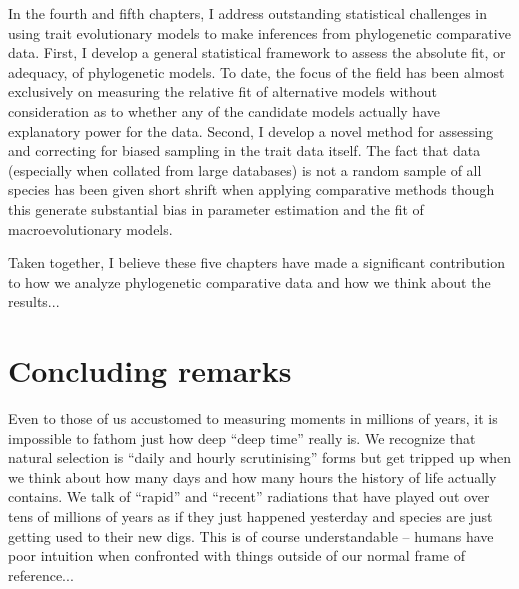 In the fourth and fifth chapters, I address outstanding statistical challenges in using trait evolutionary models to make inferences from phylogenetic comparative data. First, I develop a general statistical framework to assess the absolute fit, or adequacy, of phylogenetic models. To date, the focus of the field has been almost exclusively on measuring the relative fit of alternative models without consideration as to whether any of the candidate models actually have explanatory power for the data. Second, I develop a novel method for assessing and correcting for biased sampling in the trait data itself. The fact that data (especially when collated from large databases) is not a random sample of all species has been given short shrift when applying comparative methods though this generate substantial bias in parameter estimation and the fit of macroevolutionary models. 

Taken together, I believe these five chapters have made a significant contribution to how we analyze phylogenetic comparative data and how we think about the results...

\section{Concluding remarks}
Even to those of us accustomed to measuring moments in millions of years, it is impossible to fathom just how deep ``deep time'' really is. We recognize that natural selection is ``daily and hourly scrutinising'' \citep[][p. 84]{Darwin1859} forms but get tripped up when we think about how many days and how many hours the history of life actually contains. We talk of ``rapid'' and ``recent'' radiations that have played out over tens of millions of years as if they just happened yesterday and species are just getting used to their new digs. This is of course understandable -- humans have poor intuition when confronted with things outside of our normal frame of reference...

   

